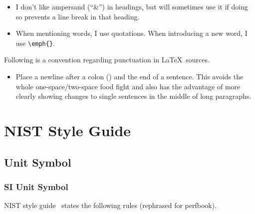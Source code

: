 \begin{itemize}
  An ambiguous example:
  \begin{quote}
    If I take the cow, the pig, the horse, etc. George will be upset.
  \end{quote}
  can be written with more words:
  \begin{quote}
    If I take the cow, the pig, the horse, or much of anything else,
    George will be upset.
  \end{quote}
  or:
  \begin{quote}
    If I take the cow, the pig, the horse, etc., George will be upset.
  \end{quote}
\item I don't like ampersand (``\&'') in headings, but will sometimes
  use it if doing so prevents a line break in that heading.
\item When mentioning words, I use quotations.
  When introducing a new word, I use \verb|\emph{}|.
\end{itemize}

Following is a convention regarding punctuation in \LaTeX\ sources.

\begin{itemize}
\item Place a newline after a colon (\co{:}) and the end of a sentence.
  This avoids the whole one-space/two-space food fight and also has
  the advantage of more clearly showing changes to single sentences
  in the middle of long paragraphs.
\end{itemize}

\section{NIST Style Guide}
\label{sec:app:styleguide:NIST Style Guide}

\subsection{Unit Symbol}
\label{sec:app:styleguide:Unit Symbol}

\subsubsection{SI Unit Symbol}
\label{sec:app:styleguide:SI Unit Symbol}

NIST style guide~\cite[Chapter 5]{NIST:SP:330:2019}
states the following rules (rephrased for perfbook).

